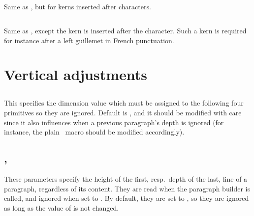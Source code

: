 \documentclass{pdftexmanual}
\begin{document}
\subsection{}

Same as , but for kerns inserted after characters.

\subsection{}

Same as , except the kern is inserted after the
character.  Such a kern is required for instance after a left guillemet
in French punctuation.

\section{Vertical adjustments}

\subsection{}

This specifies the dimension value which must be assigned to the
following four primitives so they are ignored. Default is
\type{-1000pt}, and it should be modified with care since it also
influences when a previous paragraph's depth is ignored (for instance,
the plain \TEX\ macro  should be modified
accordingly).

\subsection{, }

These parameters specify the height of the first, resp.\ depth of the
last, line of a paragraph, regardless of its content. They are read when
the paragraph builder is called, and ignored when set to
. By default, they are set to \type{-1000pt}, so
they are ignored as long as the value of  is not
changed.
\end{document}
